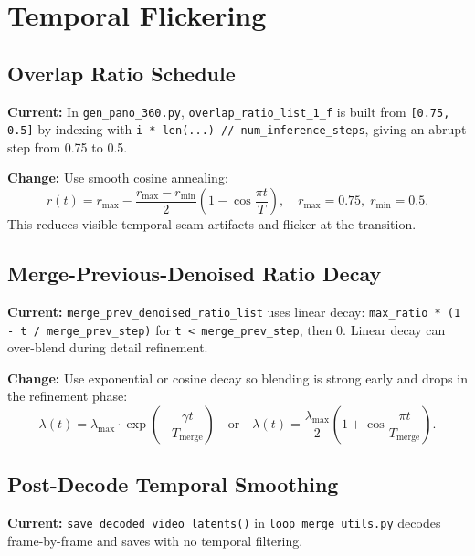 \documentclass[11pt,a4paper]{article}
\newcommand{\file}[1]{\texttt{#1}}
\newcommand{\fn}[1]{\texttt{#1}}
\begin{document}
\section{Temporal Flickering}

\subsection{Overlap Ratio Schedule}

\textbf{Current:} In \file{gen\_pano\_360.py}, \fn{overlap\_ratio\_list\_1\_f} is built from \fn{[0.75, 0.5]} by indexing with \fn{i * len(...) // num\_inference\_steps}, giving an abrupt step from 0.75 to 0.5.

\textbf{Change:} Use smooth cosine annealing:
\begin{equation}
r(t) = r_{\max} - \frac{r_{\max}-r_{\min}}{2}\left(1 - \cos\frac{\pi t}{T}\right), \quad r_{\max}=0.75,\; r_{\min}=0.5.
\end{equation}
This reduces visible temporal seam artifacts and flicker at the transition.

\subsection{Merge-Previous-Denoised Ratio Decay}

\textbf{Current:} \fn{merge\_prev\_denoised\_ratio\_list} uses linear decay: \fn{max\_ratio * (1 - t / merge\_prev\_step)} for \fn{t < merge\_prev\_step}, then 0. Linear decay can over-blend during detail refinement.

\textbf{Change:} Use exponential or cosine decay so blending is strong early and drops in the refinement phase:
\begin{equation}
\lambda(t) = \lambda_{\max} \cdot \exp\left(-\frac{\gamma t}{T_{\text{merge}}}\right)
\quad\text{or}\quad
\lambda(t) = \frac{\lambda_{\max}}{2}\left(1 + \cos\frac{\pi t}{T_{\text{merge}}}\right).
\end{equation}

\subsection{Post-Decode Temporal Smoothing}
\label{sec:flicker}

\textbf{Current:} \fn{save\_decoded\_video\_latents()} in \file{loop\_merge\_utils.py} decodes frame-by-frame and saves with no temporal filtering.
\end{document}
